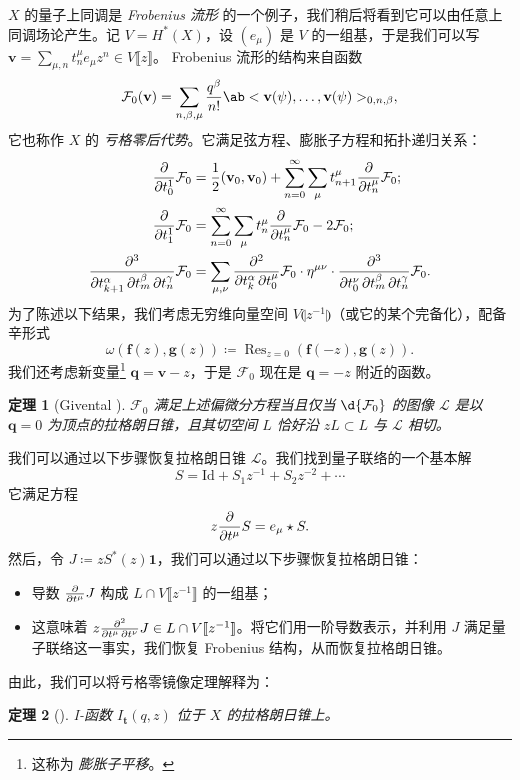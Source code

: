 \documentclass{amsart}
\newtheorem{thm}{定理}[section]
\theoremstyle{definition}
\theoremstyle{remark}
\theoremstyle{plain}
\theoremstyle{definition}
\theoremstyle{remark}
\newcommand{\mc}[1]{\mathcal{#1}}
\newcommand{\mbf}[1]{\mathbf{#1}}
\newcommand{\bv}{\mbf{v}}
\newcommand{\bq}{\mbf{q}}
\newcommand{\mr}[1]{\mathrm{#1}}
\newcommand{\on}[1]{\operatorname{#1}}
\newcommand{\1}{\mathbf{1}}
\newcommand{\2}{\mathbf{2}}
\newcommand{\3}{\mathbf{3}}
\newcommand{\ps}[1]{\llbracket #1 \rrbracket}
\newcommand{\ls}[1]{\llparenthesis #1 \rrparenthesis}
\begin{document}
\(X\) 的量子上同调是 \textit{Frobenius 流形} 的一个例子，我们稍后将看到它可以由任意上同调场论产生。记 \(V = H^*(X)\)，设 \((e_{\mu})\) 是 \(V\) 的一组基，于是我们可以写 $\bv = \sum_{\mu,n} t^{\mu}_n e_{\mu} z^n \in V\ps{z}$。
Frobenius 流形的结构来自函数
\[
    \mc{F}_0(\bv) = \sum_{n, \beta, \mu} \frac{q^{\beta}}{n!} \ab<\bv(\psi), \ldots, \bv(\psi)>_{0,n,\beta},
\]
它也称作 \(X\) 的 \textit{亏格零后代势}。它满足弦方程、膨胀子方程和拓扑递归关系：
\begin{align*}
    \pdv{}{t_0^1} \mc{F}_0 &= \frac{1}{2} (\bv_0, \bv_0) + \sum_{n=0}^{\infty} \sum_{\mu} t_{n+1}^{\mu} \pdv{}{t_n^{\mu}} \mc{F}_0; \\
    \pdv{}{t_1^1} \mc{F}_0 &= \sum_{n=0}^{\infty} \sum_{\mu} t_n^{\mu} \pdv{}{t_n^{\mu}}\mc{F}_0 - 2 \mc{F}_0; \\
    \pdv{}{t_{k+1}^{\alpha},t_m^{\beta},t_n^{\gamma}} \mc{F}_0 &= \sum_{\mu,\nu} \pdv{}{t_k^{\alpha},t_0^{\mu}} \mc{F}_0 \cdot \eta^{\mu\nu} \cdot \pdv{}{t_0^{\nu},t_{m}^{\beta},t_n^{\gamma}} \mc{F}_0.
\end{align*}
为了陈述以下结果，我们考虑无穷维向量空间 $V\ls{z^{-1}}$（或它的某个完备化），配备辛形式
\[ \omega(\mbf{f}(z), \mbf{g}(z)) \coloneqq \on{Res}_{z=0}(\mbf{f}(-z), \mbf{g}(z)). \]
我们还考虑新变量\footnote{这称为 \textit{膨胀子平移}。} $\bq = \bv - z$，于是 $\mc{F}_0$ 现在是 $\bq = -z$ 附近的函数。

\begin{thm}[Givental {\cite{Givental2004}}]
    $\mc{F}_0$ 满足上述偏微分方程当且仅当 $\d{\mc{F}_0}$ 的图像 $\mc{L}$ 是以 $\bq = 0$ 为顶点的拉格朗日锥，且其切空间 $L$ 恰好沿 $zL \subset L$ 与 $\mc{L}$ 相切。
\end{thm}

我们可以通过以下步骤恢复拉格朗日锥 $\mc{L}$。我们找到量子联络的一个基本解
\[ S = \mr{Id} + S_1 z^{-1} + S_2 z^{-2} + \cdots \]
它满足方程
\[ z \pdv{}{t^{\mu}}S = e_{\mu} \star S. \]
然后，令 $J \coloneqq z S^*(z) \1$，我们可以通过以下步骤恢复拉格朗日锥：
\begin{itemize}
    \item 导数 $\pdv{}{t^{\mu}} J$ 构成 $L \cap V\ps{z^{-1}}$ 的一组基；
    \item 这意味着 $z \pdv{}{t^{\mu},t^{\nu}} J \in L \cap V \ps{z^{-1}}$。将它们用一阶导数表示，并利用 $J$ 满足量子联络这一事实，我们恢复 Frobenius 结构，从而恢复拉格朗日锥。
\end{itemize}

由此，我们可以将亏格零镜像定理解释为：
\begin{thm}[{\cite{Givental1998}}]
    I-函数 \(I_{\mbf{t}}(q,z)\) 位于 \(X\) 的拉格朗日锥上。
\end{thm}
\end{document}
